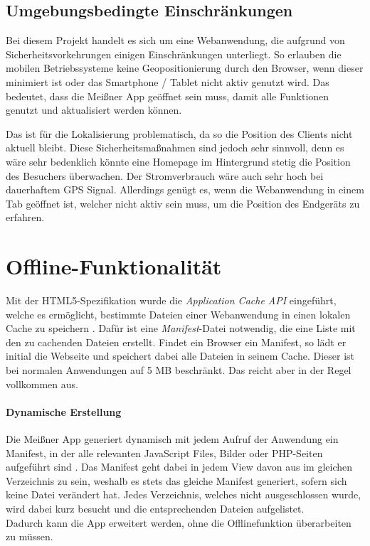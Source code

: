 \subsection{Umgebungsbedingte Einschränkungen}
Bei diesem Projekt handelt es sich um eine Webanwendung, die aufgrund von Sicherheitsvorkehrungen einigen Einschränkungen unterliegt. So erlauben die mobilen Betriebssysteme keine Geopositionierung durch den Browser, wenn dieser minimiert ist oder das Smartphone / Tablet nicht aktiv genutzt wird. Das bedeutet, dass die Meißner App geöffnet sein muss, damit alle Funktionen genutzt und aktualisiert werden können.\par

Das ist für die Lokalisierung problematisch, da so die Position des Clients nicht aktuell bleibt. Diese Sicherheitsmaßnahmen sind jedoch sehr sinnvoll, denn es wäre sehr bedenklich könnte eine Homepage im Hintergrund stetig die Position des Besuchers überwachen. Der Stromverbrauch wäre auch sehr hoch bei dauerhaftem GPS Signal. Allerdings genügt es, wenn die Webanwendung in einem Tab geöffnet ist, welcher nicht aktiv sein muss, um die Position des Endgeräts zu erfahren.


\section{Offline-Funktionalität}
Mit der HTML5-Spezifikation wurde die \emph{Application Cache API} eingeführt, welche es ermöglicht, bestimmte Dateien einer Webanwendung in einen lokalen Cache zu speichern \cite[S. 189f]{friberg2013web}. Dafür ist eine \emph{Manifest}-Datei notwendig, die eine Liste mit den zu cachenden Dateien erstellt. Findet ein Browser ein Manifest, so lädt er initial die Webseite und speichert dabei alle Dateien in seinem Cache. Dieser ist bei normalen Anwendungen auf 5 MB beschränkt. Das reicht aber in der Regel vollkommen aus.\par

\paragraph{Dynamische Erstellung}
Die Meißner App generiert dynamisch mit jedem Aufruf der Anwendung ein Manifest, in der alle relevanten JavaScript Files, Bilder oder PHP-Seiten aufgeführt sind \cite{dynamic:manifest}. Das Manifest geht dabei in jedem View davon aus im gleichen Verzeichnis zu sein, weshalb es stets das gleiche Manifest generiert, sofern sich keine Datei verändert hat. Jedes Verzeichnis, welches nicht ausgeschlossen wurde, wird dabei kurz besucht und die entsprechenden Dateien aufgelistet.\\
Dadurch kann die App erweitert werden, ohne die Offlinefunktion überarbeiten zu müssen.

